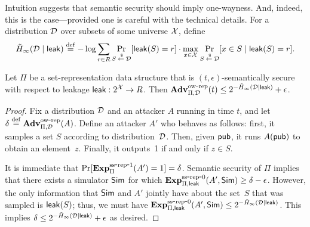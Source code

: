 Intuition suggests that semantic security should imply one-wayness. And, indeed, this is
the case---provided one is careful with the technical details.
For a distribution ${\cal D}$
over subsets of some universe ${\cal X}$, define
\[\tilde H_\infty({\cal D} \mid {\sf leak}) \stackrel{\rm def}{=} -\log \sum_{r \in R} \Pr_{S {\:\stackrel{{\scriptscriptstyle \hspace{0.2em}\$}} {\leftarrow}\:} {\cal D}}[{\sf leak}(S)=r] \cdot
\max_{x \in {\cal X}} \Pr_{S {\:\stackrel{{\scriptscriptstyle \hspace{0.2em}\$}} {\leftarrow}\:} {\cal D}}[x \in S \mid {\sf leak}(S)=r].\]

\begin{theorem}
Let $\Pi$ be a set-representation data structure that is $(t, \epsilon)$-semantically secure
with respect to leakage ${\sf leak}:2^{\cal X} \rightarrow R$.
Then $\mathrm{\mathbf{Adv}}^{\mathrm{ow\mbox{-}rep}}_{\Pi,\mathcal{D}}(t) \leq 2^{-\tilde H_\infty({\cal D} \mid {\sf leak})} + \epsilon$.
\end{theorem}
\begin{proof}
Fix a distribution ${\cal D}$ and an attacker
$A$ running in time $t$, and let $\delta \stackrel{\rm def}{=} \mathrm{\mathbf{Adv}}^{\mathrm{ow\mbox{-}rep}}_{\Pi,\mathcal{D}}(A)$.
Define an attacker $A'$ who behaves as follows: first, it samples a set $S$ according to
distribution~${\cal D}$. Then, given ${\sf pub}$, it runs $A({\sf pub})$ to obtain an element~$z$.
Finally, it outputs~1 if and only if $z \in S$.

It is immediate that $\Pr[\mathrm{\mathbf{Exp}}^{\mathrm{ss\mbox{-}rep\mbox{-}1}}_{\Pi}(A')=1] = \delta$. Semantic
security of $\Pi$ implies that there exists a simulator ${\sf Sim}$ for which
$\mathrm{\mathbf{Exp}}^{\mathrm{ss\mbox{-}rep\mbox{-}0}}_{\Pi, {\sf leak}}(A', {\sf Sim}) \geq \delta - \epsilon$. However,
the only information
that ${\sf Sim}$
and $A'$ jointly have about the set~$S$ that was sampled is ${\sf leak}(S)$; thus,
we must have $\mathrm{\mathbf{Exp}}^{\mathrm{ss\mbox{-}rep\mbox{-}0}}_{\Pi, {\sf leak}}(A', {\sf Sim}) \leq 2^{-\tilde H_\infty({\cal D} \mid {\sf leak})}$.
This implies
$\delta \leq 2^{-\tilde H_\infty({\cal D} \mid {\sf leak})}+\epsilon$ as desired.
\end{proof}

